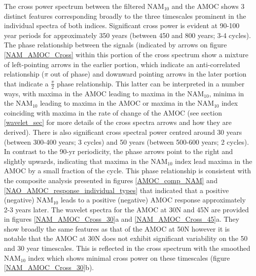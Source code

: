 The cross power spectrum between the filtered NAM$_{10}$ and the AMOC shows 3 distinct features corresponding broadly to the three timescales prominent in the individual spectra of both indices. Significant cross power is evident at 90-100 year periods for approximately 350 years (between 450 and 800 years; 3-4 cycles). The phase relationship between the signals (indicated by arrows on figure \ref{NAM_AMOC_Cross} within this portion of the cross spectrum  show a mixture of left-pointing arrows in the earlier portion, which indicate an anti-correlated relationship  ($\pi$ out of phase) and downward pointing arrows in the later portion that indicate a $\frac{\pi}{2}$ phase relationship. This latter can be interpreted in a number ways, with maxima in the AMOC leading to maxima in the NAM$_{10}$, minima in the NAM$_{10}$ leading to maxima in the AMOC or maxima in the NAM$_{10}$ index coinciding with maxima in the rate of change of the AMOC (see section \ref{wavelet_sec} for more details of the cross spectra arrows and how they are derived). There is also significant cross spectral power centred around 30 years (between 300-400 years; 3 cycles) and 50 years (between 500-600 years; 2 cycles). In contrast to the 90-yr periodicity, the phase arrows point to the right and slightly upwards, indicating that maxima in the NAM$_{10}$ index lead maxima in the AMOC by a small fraction of the cycle. This phase relationship is consistent with the composite analysis presented in figures \ref{AMOC_comp_NAM} and \ref{NAO_AMOC_response_individual_types} that indicated that a positive (negative) NAM$_{10}$ leads to a positive (negative) AMOC response approximately 2-3 years later. The wavelet spectra for the AMOC at 30N and 45N are provided in figures \ref{NAM_AMOC_Cross_30}a and \ref{NAM_AMOC_Cross_45}a. They show broadly the same features as that of the AMOC at 50N however it is notable that the AMOC at 30N does not exhibit significant variability on the 50 and 30 year timescales. This is reflected in the cross spectrum with the smoothed NAM$_{10}$ index which shows minimal cross power on these timescales (figure \ref{NAM_AMOC_Cross_30}b). 

